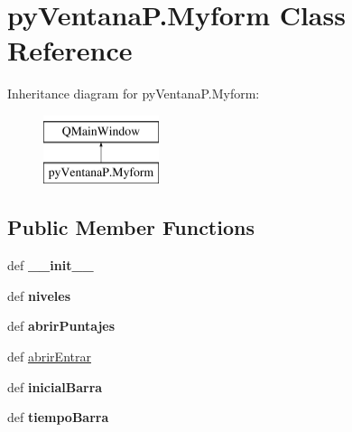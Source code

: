 \hypertarget{classpy_ventana_p_1_1_myform}{\section{py\-Ventana\-P.\-Myform Class Reference}
\label{classpy_ventana_p_1_1_myform}
}
Inheritance diagram for py\-Ventana\-P.\-Myform\-:\begin{figure}[H]
\begin{center}
\leavevmode
\includegraphics[height=2.000000cm]{classpy_ventana_p_1_1_myform}
\end{center}
\end{figure}
\subsection*{Public Member Functions}
\begin{DoxyCompactItemize}
\item 
\hypertarget{classpy_ventana_p_1_1_myform_a5bcde49821a25bd356dba183ec30e0a2}{def {\bfseries \-\_\-\-\_\-init\-\_\-\-\_\-}}\label{classpy_ventana_p_1_1_myform_a5bcde49821a25bd356dba183ec30e0a2}

\item 
\hypertarget{classpy_ventana_p_1_1_myform_a5f7aa3300f3e72ed75a5b981a4d12c86}{def {\bfseries niveles}}\label{classpy_ventana_p_1_1_myform_a5f7aa3300f3e72ed75a5b981a4d12c86}

\item 
\hypertarget{classpy_ventana_p_1_1_myform_ae43d2fe45766a02dda8dc8c18926d8b5}{def {\bfseries abrir\-Puntajes}}\label{classpy_ventana_p_1_1_myform_ae43d2fe45766a02dda8dc8c18926d8b5}

\item 
def \hyperlink{classpy_ventana_p_1_1_myform_a754fd0296b0df7068ec790267da1df76}{abrir\-Entrar}
\item 
\hypertarget{classpy_ventana_p_1_1_myform_a5718e29c06ffe68c1c34fe16b90d4cf5}{def {\bfseries inicial\-Barra}}\label{classpy_ventana_p_1_1_myform_a5718e29c06ffe68c1c34fe16b90d4cf5}

\item 
\hypertarget{classpy_ventana_p_1_1_myform_a42d99be518114c8a5781a972deabe10f}{def {\bfseries tiempo\-Barra}}\label{classpy_ventana_p_1_1_myform_a42d99be518114c8a5781a972deabe10f}

\end{DoxyCompactItemize}
